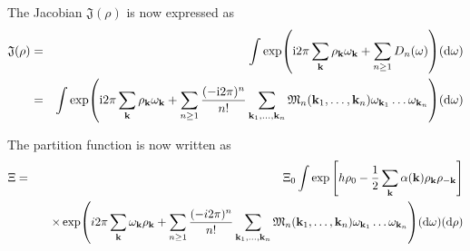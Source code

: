 The Jacobian $\mathfrak{J}(\rho)$ is now expressed as
\begin{eqnarray}
	\mathfrak{J}(\rho) &=& \int \exp({\rm i} 2\pi \sum_{\vb k}\rho_{\vb k}\omega_{\vb k} + \sum_{n\geq 1} D_n(\omega) ) ({\rm d} \omega)
	\nonumber\\
	&=& \int \exp({\rm i} 2\pi \sum_{\vb k}\rho_{\vb k}\omega_{\vb k} 
	+ \sum_{n\geq 1} \frac{(-{\rm i}2\pi)^n}{n!}\sum_{\vb{k}_1,\dotsc,\vb{k}_n}\mathfrak{M}_n(\vb k_1, \dotsc, \vb k_n) \omega_{{\vb k}_1}\dotsc \omega_{{\vb k}_n}) ({\rm d} \omega)
\end{eqnarray}

The partition function is now written as
\begin{eqnarray}
	\Xi &=& \Xi_0 \int \exp \left[h \rho_0 - \frac12
	\sum\limits_{\bf k} \alpha(\vb k) \rho_{\bf k}\rho_{-{\bf k}} \right]
	\\
	&&
	\quad \times
	\exp (i2\pi \sum\limits_{\bf k} \omega_{\bf k} \rho_{\bf k} + \sum_{n\ge 1} \frac{(-i2\pi)^n}{n!}\sum_{\vb{k}_1,\dotsc,\vb{k}_n} {\mathfrak M}_n(\vb{k}_1,\dotsc,\vb{k}_n) \omega_{\vb k_1}\dotsc\omega_{\vb{k}_n})
	({\rm d}\omega) ({\rm d}\rho) \nonumber
\end{eqnarray}
